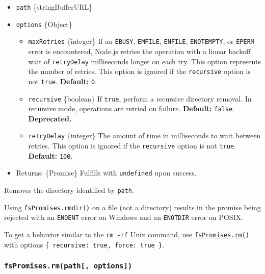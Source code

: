 \begin{itemize}
\tightlist
\item
  \texttt{path} \{string\textbar Buffer\textbar URL\}
\item
  \texttt{options} \{Object\}

  \begin{itemize}
  \tightlist
  \item
    \texttt{maxRetries} \{integer\} If an \texttt{EBUSY},
    \texttt{EMFILE}, \texttt{ENFILE}, \texttt{ENOTEMPTY}, or
    \texttt{EPERM} error is encountered, Node.js retries the operation
    with a linear backoff wait of \texttt{retryDelay} milliseconds
    longer on each try. This option represents the number of retries.
    This option is ignored if the \texttt{recursive} option is not
    \texttt{true}. \textbf{Default:} \texttt{0}.
  \item
    \texttt{recursive} \{boolean\} If \texttt{true}, perform a recursive
    directory removal. In recursive mode, operations are retried on
    failure. \textbf{Default:} \texttt{false}. \textbf{Deprecated.}
  \item
    \texttt{retryDelay} \{integer\} The amount of time in milliseconds
    to wait between retries. This option is ignored if the
    \texttt{recursive} option is not \texttt{true}. \textbf{Default:}
    \texttt{100}.
  \end{itemize}
\item
  Returns: \{Promise\} Fulfills with \texttt{undefined} upon success.
\end{itemize}

Removes the directory identified by \texttt{path}.

Using \texttt{fsPromises.rmdir()} on a file (not a directory) results in
the promise being rejected with an \texttt{ENOENT} error on Windows and
an \texttt{ENOTDIR} error on POSIX.

To get a behavior similar to the \texttt{rm\ -rf} Unix command, use
\hyperref[fspromisesrmpath-options]{\texttt{fsPromises.rm()}} with
options \texttt{\{\ recursive:\ true,\ force:\ true\ \}}.

\subsubsection{\texorpdfstring{\texttt{fsPromises.rm(path{[},\ options{]})}}{fsPromises.rm(path{[}, options{]})}}\label{fspromises.rmpath-options}


